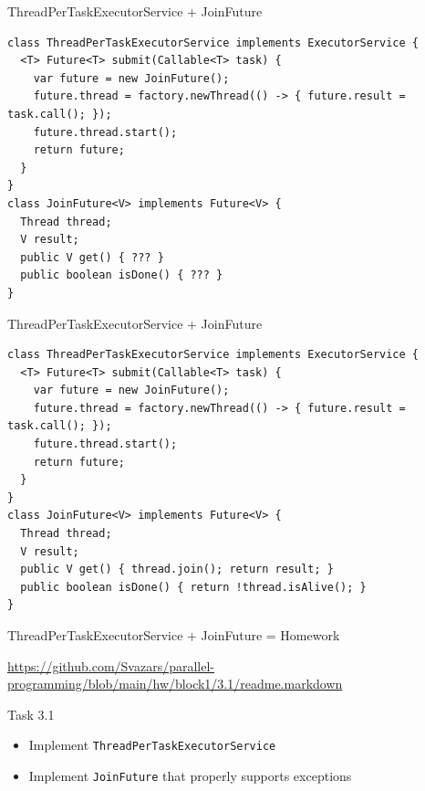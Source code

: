 \begin{frame}{ThreadPerTaskExecutorService + JoinFuture}

\begin{verbatim}
class ThreadPerTaskExecutorService implements ExecutorService {    
  <T> Future<T> submit(Callable<T> task) {
    var future = new JoinFuture();
    future.thread = factory.newThread(() -> { future.result = task.call(); });
    future.thread.start();
    return future;        
  }
}
class JoinFuture<V> implements Future<V> {
  Thread thread; 
  V result;
  public V get() { ??? }
  public boolean isDone() { ??? }
}
\end{verbatim}
\end{frame}


\begin{frame}{ThreadPerTaskExecutorService + JoinFuture}

\begin{verbatim}
class ThreadPerTaskExecutorService implements ExecutorService {    
  <T> Future<T> submit(Callable<T> task) {
    var future = new JoinFuture();
    future.thread = factory.newThread(() -> { future.result = task.call(); });
    future.thread.start();
    return future;        
  }
}
class JoinFuture<V> implements Future<V> {
  Thread thread; 
  V result;
  public V get() { thread.join(); return result; }
  public boolean isDone() { return !thread.isAlive(); }
}
\end{verbatim}
\end{frame}


\begin{frame}[t,fragile]{ThreadPerTaskExecutorService + JoinFuture = Homework}

{\tiny\url{https://github.com/Svazars/parallel-programming/blob/main/hw/block1/3.1/readme.markdown}}
\begin{homeworkmail}{Task 3.1}
    \begin{itemize}
        \item Implement \texttt{ThreadPerTaskExecutorService}
        \item Implement \texttt{JoinFuture} that properly supports exceptions
    \end{itemize}
\end{homeworkmail}
\end{frame}

